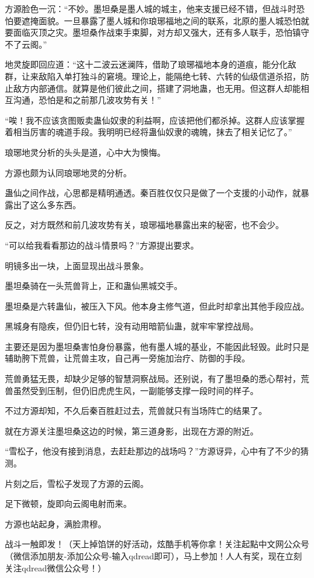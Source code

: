 \begin{this_body}
方源脸色一沉：“不妙。墨坦桑是墨人城的城主，他来支援已经不错，但战斗时恐怕要遮掩面貌。一旦暴露了墨人城和你琅琊福地之间的联系，北原的墨人城恐怕就要面临灭顶之灾。墨坦桑作战束手束脚，对方却又强大，还有多人联手，恐怕镇守不了云阁。”

地灵旋即回应道：“这十二波云迷澜阵，借助了琅琊福地本身的道痕，能分化敌群，让来敌陷入单打独斗的窘境。理论上，能隔绝七转、六转的仙级信道杀招，防止敌方内部通信。就算是他们彼此之间，搭建了洞地蛊，也无用。但这群人却能相互沟通，恐怕是和之前那几波攻势有关！”

“唉！我不应该贪图贩卖蛊仙奴隶的利益啊，应该把他们都杀掉。这群人应该掌握着相当厉害的魂道手段。我明明已经将蛊仙奴隶的魂魄，抹去了相关记忆了。”

琅琊地灵分析的头头是道，心中大为懊悔。

方源也颇为认同琅琊地灵的分析。

蛊仙之间作战，心思都是精明通透。秦百胜仅仅只是做了一个支援的小动作，就暴露出了这么多东西。

反之，对方既然和前几波攻势有关，琅琊福地暴露出来的秘密，也不会少。

“可以给我看看那边的战斗情景吗？”方源提出要求。

明镜多出一块，上面显现出战斗景象。

墨坦桑骑在一头荒兽背上，正和蛊仙黑城交手。

墨坦桑是六转蛊仙，被压入下风。他本身主修气道，但此时却拿出其他手段应战。

黑城身有隐疾，但仍旧七转，没有动用暗箭仙蛊，就牢牢掌控战局。

主要还是因为墨坦桑害怕身份暴露，他有墨人城的基业，不能因此轻毁。此时只是辅助胯下荒兽，让荒兽主攻，自己再一旁施加治疗、防御的手段。

荒兽勇猛无畏，却缺少足够的智慧洞察战局。还别说，有了墨坦桑的悉心帮衬，荒兽虽然受到压制，但仍旧虎虎生风，一副能够支撑一段时间的样子。

不过方源却知，不久后秦百胜赶过去，荒兽就只有当场阵亡的结果了。

就在方源关注墨坦桑这边的时候，第三道身影，出现在方源的附近。

“雪松子，他没有接到消息，去赶赴那边的战场吗？”方源讶异，心中有了不少的猜测。

片刻之后，雪松子发现了方源的云阁。

足下微顿，旋即向云阁电射而来。

方源也站起身，满脸肃穆。

战斗一触即发！（天上掉馅饼的好活动，炫酷手机等你拿！关注起點中文网公众号（微信添加朋友-添加公众号-输入qdread即可），马上参加！人人有奖，现在立刻关注qdread微信公众号！）

\end{this_body}

